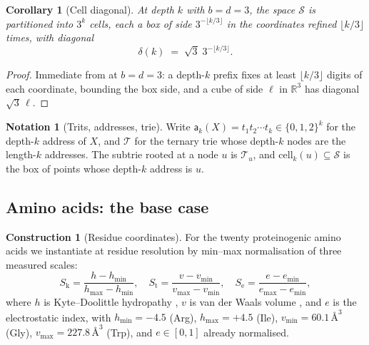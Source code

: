 \documentclass[11pt,twocolumn,a4paper]{article}
\theoremstyle{thmstyle}
\newtheorem{corollary}[theorem]{Corollary}
\theoremstyle{definition}
\newtheorem{construction}[theorem]{Construction}
\newtheorem{notation}[theorem]{Notation}
\theoremstyle{remark}
\newcommand{\R}{\mathbb{R}}
\newcommand{\Sk}{S_{\mathrm{k}}}
\newcommand{\St}{S_{\mathrm{t}}}
\newcommand{\Se}{S_{\mathrm{e}}}
\newcommand{\Sspace}{\mathcal{S}}
\newcommand{\Trie}{\mathscr{T}}
\newcommand{\addr}{\mathsf{a}}
\begin{document}
\begin{corollary}[Cell diagonal]
\label{cor:cell-diag}
At depth $k$ with $b = d = 3$, the space $\Sspace$ is partitioned into
$3^k$ cells, each a box of side $3^{-\lfloor k/3\rfloor}$ in the
coordinates refined $\lfloor k/3\rfloor$ times, with diagonal
\begin{equation}
  \delta(k) \;=\; \sqrt3\; 3^{-\lfloor k/3\rfloor}.
  \label{eq:cell-diag}
\end{equation}
\end{corollary}

\begin{proof}
Immediate from  at $b = d = 3$: a depth-$k$
prefix fixes at least $\lfloor k/3\rfloor$ digits of each coordinate,
bounding the box side, and a cube of side $\ell$ in $\R^3$ has
diagonal $\sqrt3\,\ell$.
\end{proof}

\begin{notation}[Trits, addresses, trie]
\label{not:address}
Write $\addr_k(X) = t_1t_2\cdots t_k \in \{0,1,2\}^k$ for the depth-$k$
address of $X$, and $\Trie$ for the ternary trie
\citep{fredkin1960,knuth1998} whose depth-$k$ nodes are the length-$k$
addresses. The subtrie rooted at a node $u$ is $\Trie_u$, and
$\mathrm{cell}_k(u) \subseteq \Sspace$ is the box of points whose
depth-$k$ address is $u$.
\end{notation}

\subsection{Amino acids: the base case}

\begin{construction}[Residue coordinates]
\label{con:aa-coords}
For the twenty proteinogenic amino acids we instantiate
 at residue resolution by min--max normalisation of
three measured scales:
\begin{equation}
  \Sk = \frac{h - h_{\min}}{h_{\max}-h_{\min}},
  \quad
  \St = \frac{v - v_{\min}}{v_{\max}-v_{\min}},
  \quad
  \Se = \frac{e - e_{\min}}{e_{\max}-e_{\min}},
  \label{eq:aa-normalisation}
\end{equation}
where $h$ is Kyte--Doolittle hydropathy \citep{kyte1982}, $v$ is van
der Waals volume \citep{zamyatnin1972}, and $e$ is the electrostatic
index, with $h_{\min} = -4.5$ (Arg), $h_{\max} = +4.5$ (Ile),
$v_{\min} = 60.1\,\text{\AA}^3$ (Gly),
$v_{\max} = 227.8\,\text{\AA}^3$ (Trp), and $e \in [0,1]$ already
normalised.
\end{construction}
\end{document}
